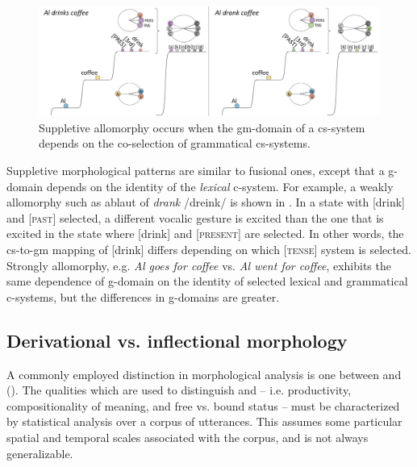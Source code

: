   
\begin{figure}
\includegraphics[width=\textwidth]{figures/Tilsen-img69.png}
\caption{Suppletive allomorphy occurs when the gm-domain of a cs-system depends on the co-selection of grammatical cs-systems.}
\label{fig:4:19}
\end{figure}
 

  Suppletive morphological patterns are similar to fusional ones, except that a  g-domain depends on the identity of the \textit{lexical} c-system. For example, a weakly  allomorphy such as ablaut of \textit{drank} /dreink/ is shown in {}. In a state with [drink] and [\textsc{past}] selected, a different vocalic gesture is excited than the one that is excited in the state where [drink] and [\textsc{present}] are selected. In other words, the cs-to-gm mapping of [drink] differs depending on which [\textsc{tense}] system is selected. Strongly  allomorphy, e.g. \textit{Al goes for coffee} vs. \textit{Al went for coffee}, exhibits the same dependence of g-domain on the identity of selected lexical and grammatical c-systems, but the differences in g-domains are greater.

\subsection{Derivational vs. inflectional morphology}

A commonly employed distinction in morphological analysis is one between  and  (\citealt{BickelNichols2007,Booij1996,Dressler1989,HaspelmathSims2013}). The qualities which are used to distinguish  and  -- i.e. productivity, compositionality of meaning, and free vs. bound status -- must be characterized by statistical analysis over a corpus of utterances. This assumes some particular spatial and temporal scales associated with the corpus, and is not always generalizable. 

